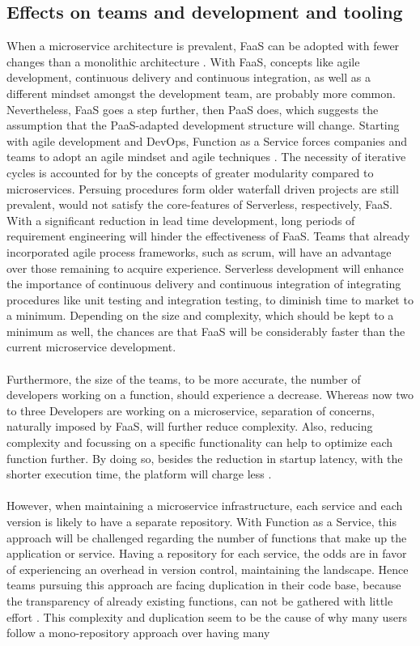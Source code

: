 \documentclass[11pt]{article}
\begin{document}
\subsection{Effects on teams and development and tooling}
When a microservice architecture is prevalent, FaaS can be adopted with fewer changes than a monolithic architecture \cite{fox2017status}. With FaaS, concepts like agile development, continuous delivery and continuous integration, as well as a different mindset amongst the development team, are probably more common. Nevertheless, FaaS goes a step further, then PaaS does, which suggests the assumption that the PaaS-adapted development structure will change. Starting with agile development and \glqq DevOps\grqq{}, Function as a Service forces companies and teams to adopt an agile mindset and agile techniques \cite{benlian2018transformative}. The necessity of iterative cycles is accounted for by the concepts of greater modularity compared to microservices. Persuing procedures form older waterfall driven projects are still prevalent, would not satisfy the core-features of Serverless, respectively, FaaS. With a significant reduction in lead time development, long periods of requirement engineering will hinder the effectiveness of FaaS. Teams that already incorporated agile process frameworks, such as scrum, will have an advantage over those remaining to acquire experience. Serverless development will enhance the importance of continuous delivery and continuous integration of integrating procedures like unit testing and integration testing, to diminish time to market to a minimum. Depending on the size and complexity, which should be kept to a minimum as well, the chances are that FaaS will be considerably faster than the current microservice development.\\\\ Furthermore, the size of the teams, to be more accurate, the number of developers working on a function, should experience a decrease. Whereas now two to three Developers are working on a microservice, separation of concerns, naturally imposed by FaaS, will further reduce complexity. Also, reducing complexity and focussing on a specific functionality can help to optimize each function further. By doing so, besides the reduction in startup latency, with the shorter execution time, the platform will charge less \cite{shafiei2020serverless}.\\\\ However, when maintaining a microservice infrastructure, each service and each version is likely to have a separate repository. With Function as a Service, this approach will be challenged regarding the number of functions that make up the application or service. Having a repository for each service, the odds are in favor of experiencing an overhead in version control, maintaining the landscape. Hence teams pursuing this approach are facing duplication in their code base, because the transparency of already existing functions, can not be gathered with little effort \cite{racicot2019quality}. This complexity and duplication seem to be the cause of why many users follow a mono-repository approach over having many 
\end{document}
